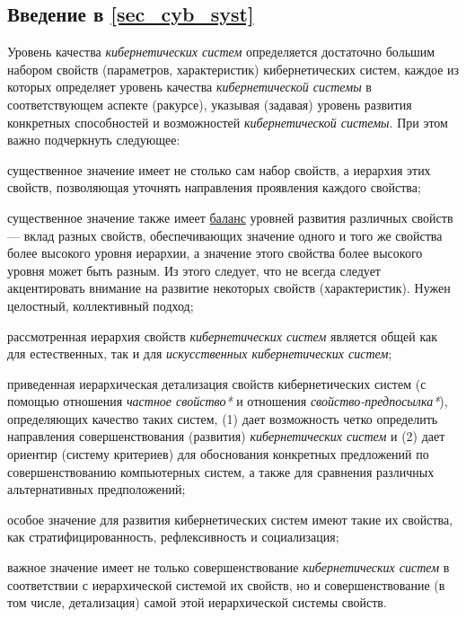 \bigskip

\subsection*{Введение в \ref{sec_cyb_syst}}

Уровень качества \textit{кибернетических систем} определяется достаточно большим набором свойств (параметров, характеристик) кибернетических систем, каждое из которых определяет уровень качества \textit{кибернетической системы} в соответствующем аспекте (ракурсе), указывая (задавая) уровень развития конкретных способностей и возможностей \textit{кибернетической системы}. 
При этом важно подчеркнуть следующее:
\begin{textitemize}
	\item существенное значение имеет не столько сам набор свойств, а иерархия этих свойств, позволяющая уточнять направления проявления каждого свойства;
	\item существенное значение также имеет \uline{баланс} уровней развития различных свойств --- вклад разных свойств, обеспечивающих значение одного и того же свойства более высокого уровня иерархии, а значение этого свойства более высокого уровня может быть разным.
	Из этого следует, что не всегда следует акцентировать внимание на развитие некоторых свойств (характеристик).
	Нужен целостный, коллективный подход;
	\item рассмотренная иерархия свойств \textit{кибернетических систем} является общей как для естественных, так и для \textit{искусственных кибернетических систем};
	\item приведенная иерархическая детализация свойств кибернетических систем (с помощью отношения \textit{частное свойство*} и отношения \textit{свойство-предпосылка*}), определяющих качество таких систем, (1) дает возможность четко определить направления совершенствования (развития) \textit{кибернетических систем} и (2) дает ориентир (систему критериев) для обоснования конкретных предложений по совершенствованию компьютерных систем, а также для сравнения различных альтернативных предположений;
	\item особое значение для развития кибернетических систем имеют такие их свойства, как стратифицированность, рефлексивность и социализация;
	\item важное значение имеет не только совершенствование \textit{кибернетических систем} в соответствии с иерархической системой их свойств, но и совершенствование (в том числе, детализация) самой этой иерархической системы свойств.
\end{textitemize}


